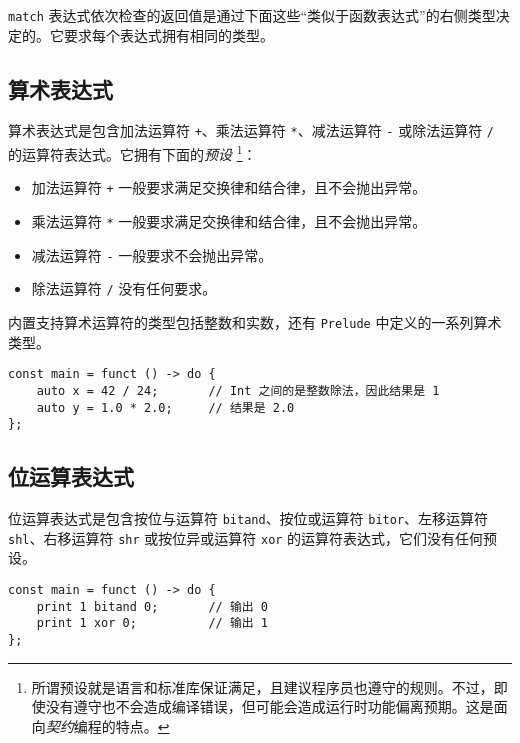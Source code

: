 \lstinline!match! 表达式依次检查的返回值是通过下面这些“类似于函数表达式”的右侧类型决定的。它要求每个表达式拥有相同的类型。

\subsection{算术表达式}

算术表达式是包含加法运算符 \lstinline!+!、乘法运算符 \lstinline!*!、减法运算符 \lstinline!-! 或除法运算符 \lstinline!/! 的运算符表达式。它拥有下面的\emph{预设} \footnote{所谓预设就是语言和标准库保证满足，且建议程序员也遵守的规则。不过，即使没有遵守也不会造成编译错误，但可能会造成运行时功能偏离预期。这是面向\emph{契约}编程的特点。}：

\begin{itemize}
    \item 加法运算符 \lstinline!+! 一般要求满足交换律和结合律，且不会抛出异常。

    \item 乘法运算符 \lstinline!*! 一般要求满足交换律和结合律，且不会抛出异常。

    \item 减法运算符 \lstinline!-! 一般要求不会抛出异常。

    \item 除法运算符 \lstinline!/! 没有任何要求。
\end{itemize}

内置支持算术运算符的类型包括整数和实数，还有 \lstinline!Prelude! 中定义的一系列算术类型。

\begin{lstlisting}
const main = funct () -> do {
    auto x = 42 / 24;       // Int 之间的是整数除法，因此结果是 1
    auto y = 1.0 * 2.0;     // 结果是 2.0
};
\end{lstlisting}

\subsection{位运算表达式}

位运算表达式是包含按位与运算符 \lstinline!bitand!、按位或运算符 \lstinline!bitor!、左移运算符 \lstinline!shl!、右移运算符 \lstinline!shr! 或按位异或运算符 \lstinline!xor! 的运算符表达式，它们没有任何预设。

\begin{lstlisting}
const main = funct () -> do {
    print 1 bitand 0;       // 输出 0
    print 1 xor 0;          // 输出 1
};
\end{lstlisting}


